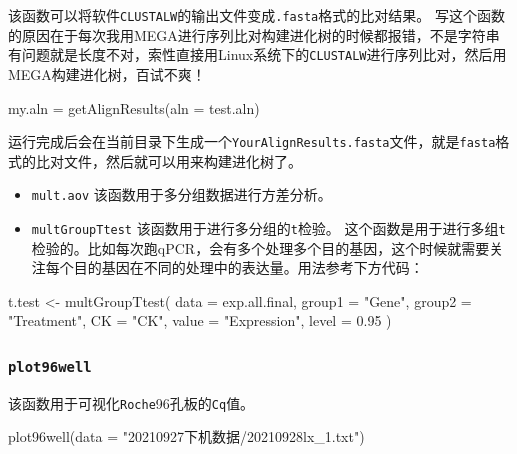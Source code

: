 \documentclass[
  10pt,
]{book}
\newenvironment{Shaded}{\begin{snugshade}}{\end{snugshade}}
\newcommand{\AttributeTok}[1]{\textcolor[rgb]{0.77,0.63,0.00}{#1}}
\newcommand{\FloatTok}[1]{\textcolor[rgb]{0.00,0.00,0.81}{#1}}
\newcommand{\FunctionTok}[1]{\textcolor[rgb]{0.00,0.00,0.00}{#1}}
\newcommand{\NormalTok}[1]{#1}
\newcommand{\OtherTok}[1]{\textcolor[rgb]{0.56,0.35,0.01}{#1}}
\newcommand{\StringTok}[1]{\textcolor[rgb]{0.31,0.60,0.02}{#1}}
\begin{document}
该函数可以将软件\texttt{CLUSTALW}的输出文件变成\texttt{.fasta}格式的比对结果。
写这个函数的原因在于每次我用MEGA进行序列比对构建进化树的时候都报错，不是字符串有问题就是长度不对，索性直接用Linux系统下的\texttt{CLUSTALW}进行序列比对，然后用MEGA构建进化树，百试不爽！

\begin{Shaded}
\begin{Highlighting}[]
\NormalTok{my.aln }\OtherTok{=} \FunctionTok{getAlignResults}\NormalTok{(}\AttributeTok{aln =} \StringTok{\textquotesingle{}test.aln\textquotesingle{}}\NormalTok{)}
\end{Highlighting}
\end{Shaded}

运行完成后会在当前目录下生成一个\texttt{YourAlignResults.fasta}文件，就是\texttt{fasta}格式的比对文件，然后就可以用来构建进化树了。

\begin{itemize}
\item
  \texttt{mult.aov}
  该函数用于多分组数据进行方差分析。
\item
  \texttt{multGroupTtest}
  该函数用于进行多分组的\texttt{t}检验。
  这个函数是用于进行多组\texttt{t}检验的。比如每次跑qPCR，会有多个处理多个目的基因，这个时候就需要关注每个目的基因在不同的处理中的表达量。用法参考下方代码：
\end{itemize}

\begin{Shaded}
\begin{Highlighting}[]
\NormalTok{t.test }\OtherTok{\textless{}{-}} \FunctionTok{multGroupTtest}\NormalTok{(}
  \AttributeTok{data =}\NormalTok{ exp.all.final,}
  \AttributeTok{group1 =} \StringTok{"Gene"}\NormalTok{,}
  \AttributeTok{group2 =} \StringTok{"Treatment"}\NormalTok{,}
  \AttributeTok{CK =} \StringTok{"CK"}\NormalTok{,}
  \AttributeTok{value =} \StringTok{"Expression"}\NormalTok{,}
  \AttributeTok{level =} \FloatTok{0.95}
\NormalTok{)}
\end{Highlighting}
\end{Shaded}

\hypertarget{plot96well}{%
\subsubsection{\texorpdfstring{\texttt{plot96well}}{plot96well}}\label{plot96well}}

该函数用于可视化\texttt{Roche}96孔板的\texttt{Cq}值。

\begin{Shaded}
\begin{Highlighting}[]
\FunctionTok{plot96well}\NormalTok{(}\AttributeTok{data =} \StringTok{"20210927下机数据/20210928lx\_1.txt"}\NormalTok{)}
\end{Highlighting}
\end{Shaded}
\end{document}
